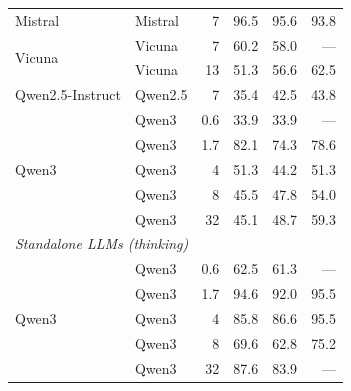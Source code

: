 \begin{table}[h]
\begin{tabular}{llrrrr}
\midrule
Mistral & Mistral & 7 & 96.5 & 95.6 & 93.8 \\
\multirow{2}{*}{Vicuna} & Vicuna & 7 & 60.2 & 58.0 & --- \\
 & Vicuna & 13 & 51.3 & 56.6 & 62.5 \\
Qwen2.5-Instruct & Qwen2.5 & 7 & 35.4 & 42.5 & 43.8 \\
\multirow{5}{*}{Qwen3} & Qwen3 & 0.6 & 33.9 & 33.9 & --- \\
 & Qwen3 & 1.7 & 82.1 & 74.3 & 78.6 \\
 & Qwen3 & 4 & 51.3 & 44.2 & 51.3 \\
 & Qwen3 & 8 & 45.5 & 47.8 & 54.0 \\
 & Qwen3 & 32 & 45.1 & 48.7 & 59.3 \\
\midrule
\multicolumn{6}{l}{\textit{Standalone LLMs (thinking)}} \\
\midrule
\multirow{5}{*}{Qwen3} & Qwen3 & 0.6 & 62.5 & 61.3 & --- \\
 & Qwen3 & 1.7 & 94.6 & 92.0 & 95.5 \\
 & Qwen3 & 4 & 85.8 & 86.6 & 95.5 \\
 & Qwen3 & 8 & 69.6 & 62.8 & 75.2 \\
 & Qwen3 & 32 & 87.6 & 83.9 & --- \\
\bottomrule
\end{tabular}
\end{table}
